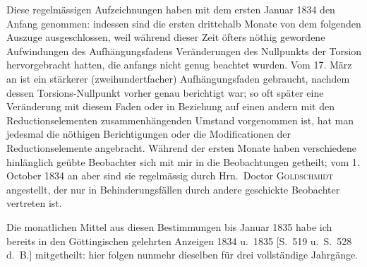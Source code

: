 Diese regelmässigen Aufzeichnungen haben mit dem ersten Januar 1834 den Anfang genommen: indessen sind die ersten drittehalb Monate von dem folgenden Auszuge ausgeschlossen, weil während dieser Zeit öfters nöthig gewordene Aufwindungen des Aufhängungsfadens Veränderungen des Nullpunkts der Torsion hervorgebracht hatten, die anfangs nicht genug beachtet wurden. Vom 17. März an ist ein stärkerer (zweihundertfacher) Aufhängungsfaden gebraucht, nachdem dessen Torsions-Nullpunkt vorher genau berichtigt war; so oft später eine Veränderung mit diesem Faden oder in Beziehung auf einen andern mit den Reductionselementen zusammenhängenden Umstand vorgenommen ist, hat man jedesmal die nöthigen Berichtigungen oder die Modificationen der Reductionselemente angebracht. Während der ersten Monate haben verschiedene hinlänglich geübte Beobachter sich mit mir in die Beobachtungen getheilt; vom 1. October 1834 an aber sind sie regelmässig durch Hrn.\ Doctor \textsc{Goldschmidt} angestellt, der nur in Behinderungsfällen durch andere geschickte Beobachter vertreten ist.

Die monatlichen Mittel aus diesen Bestimmungen bis Januar 1835 habe ich bereits in den Göttingischen gelehrten Anzeigen 1834 u.\ 1835 [S.\ 519 u.\ S.\ 528 d.\ B.] mitgetheilt: hier folgen nunmehr dieselben für drei vollständige Jahrgänge.

